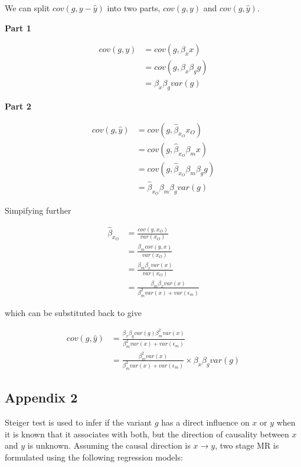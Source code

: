 \documentclass[]{article}
\begin{document}
We can split \(cov(g, y - \hat{y})\) into two parts, \(cov(g, y)\) and
\(cov(g, \hat{y})\).

\textbf{Part 1}

\[
\begin{aligned}
cov(g, y) & = cov(g, \beta_x x) \\
          & = cov(g, \beta_x \beta_g g) \\
          & = \beta_x\beta_g var(g)
\end{aligned}
\]

\textbf{Part 2}

\[
\begin{aligned}
cov(g, \hat{y}) & = cov(g, \hat{\beta}_{x_O} x_O) \\
                & = cov(g, \hat{\beta}_{x_O} \beta_m x) \\
                & = cov(g, \hat{\beta}_{x_O} \beta_m \beta_g g) \\
                & = \hat{\beta}_{x_O} \beta_m \beta_g var(g)
\end{aligned}
\]

Simpifying further

\[
\begin{aligned}
\hat{\beta}_{x_O} & = \frac{cov(y, x_O)} {var(x_O)} \\
                  & = \frac{\beta_m cov(y, x)} {var(x_O)} \\
                  & = \frac{\beta_m \beta_x var(x)} {var(x_O)} \\
                  & = \frac{\beta_m \beta_x var(x)} {\beta_m^2 var(x) + var(\epsilon_m)}
\end{aligned}
\]

which can be substituted back to give

\[
\begin{aligned}
cov(g, \hat{y}) & = \frac{\beta_x\beta_g var(g) \beta_m^2 var(x)} {\beta_m^2 var(x) + var(\epsilon_m)} \\
                & = \frac{\beta_m^2 var(x)} {\beta_m^2 var(x) + var(\epsilon_m)} \times \beta_x\beta_g var(g)
\end{aligned}
\]

\newpage

\subsection{Appendix 2}\label{appendix-2}

Steiger test is used to infer if the variant \(g\) has a direct
influence on \(x\) or \(y\) when it is known that it associates with
both, but the direction of causality between \(x\) and \(y\) is unknown.
Assuming the causal direction is \(x \to y\), two stage MR is formulated
using the following regression models:
\end{document}
